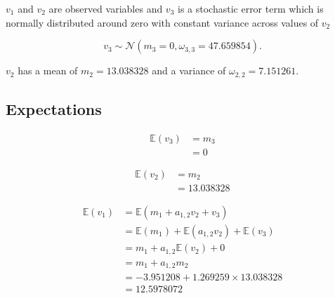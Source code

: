 \documentclass[
]{book}
\begin{document}
\noindent \(v_1\) and \(v_2\) are observed variables and
\(v_3\) is a stochastic error term which is normally distributed around zero
with constant variance across values of \(v_2\)

\begin{equation}
  v_3 
  \sim 
  \mathcal{N} \left( m_3 = 0, \omega_{3, 3} = 47.659854 \right) .
\end{equation}

\noindent \(v_2\) has a mean of \(m_2 = 13.038328\) and a variance of \(\omega_{2, 2} = 7.151261\).

\hypertarget{expectations}{%
\subsection{Expectations}\label{expectations}}

\begin{equation}
  \begin{split}
    \mathbb{E}
    \left(
      v_3
    \right)
    &=
    m_3 \\
    &=
    0
  \end{split}
\end{equation}

\begin{equation}
  \begin{split}
    \mathbb{E}
    \left(
      v_2
    \right)
    &=
    m_2 \\
    &=
  13.038328
  \end{split}
\end{equation}

\begin{equation}
  \begin{split}
    \mathbb{E}
    \left(
      v_1
    \right)
    &=
    \mathbb{E}
    \left(
      m_1 + a_{1, 2} v_2 + v_3
    \right) \\
    &=
    \mathbb{E}
    \left(
      m_1
    \right)
    +
    \mathbb{E}
    \left(
      a_{1, 2} v_2
    \right)
    +
    \mathbb{E}
    \left(
      v_3
    \right) \\
    &=
    m_1
    +
    a_{1, 2}
    \mathbb{E}
    \left(
      v_2
    \right)
    +
    0 \\
    &=
    m_1
    +
    a_{1, 2}
    m_2 \\
    &=
    -3.951208
    +
    1.269259
    \times
    13.038328 \\
    &=
    12.5978072
  \end{split}
\end{equation}
\end{document}
